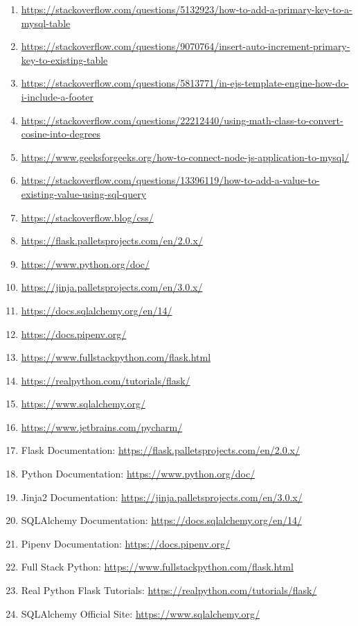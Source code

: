 \begin{enumerate}
  \item \raggedright
    \url{https://stackoverflow.com/questions/5132923/how-to-add-a-primary-key-to-a-mysql-table}
  \item \raggedright
    \url{https://stackoverflow.com/questions/9070764/insert-auto-increment-primary-key-to-existing-table}
  \item \raggedright
    \url{https://stackoverflow.com/questions/5813771/in-ejs-template-engine-how-do-i-include-a-footer}
  \item \raggedright
    \url{https://stackoverflow.com/questions/22212440/using-math-class-to-convert-cosine-into-degrees}
  \item \raggedright
    \url{https://www.geeksforgeeks.org/how-to-connect-node-js-application-to-mysql/}
  \item \raggedright
    \url{https://stackoverflow.com/questions/13396119/how-to-add-a-value-to-existing-value-using-sql-query}
  \item \raggedright \url{https://stackoverflow.blog/css/}

  \item \raggedright \url{https://flask.palletsprojects.com/en/2.0.x/}
  \item \raggedright \url{https://www.python.org/doc/}
  \item \raggedright \url{https://jinja.palletsprojects.com/en/3.0.x/}
  \item \raggedright \url{https://docs.sqlalchemy.org/en/14/}
  \item \raggedright \url{https://docs.pipenv.org/}
  \item \raggedright \url{https://www.fullstackpython.com/flask.html}
  \item \raggedright \url{https://realpython.com/tutorials/flask/}
  \item \raggedright \url{https://www.sqlalchemy.org/}
  \item \raggedright \url{https://www.jetbrains.com/pycharm/}

  \item \raggedright Flask Documentation:
    \url{https://flask.palletsprojects.com/en/2.0.x/}
  \item \raggedright Python Documentation: \url{https://www.python.org/doc/}
  \item \raggedright Jinja2 Documentation:
    \url{https://jinja.palletsprojects.com/en/3.0.x/}
  \item \raggedright SQLAlchemy Documentation:
    \url{https://docs.sqlalchemy.org/en/14/}
  \item \raggedright Pipenv Documentation: \url{https://docs.pipenv.org/}
  \item \raggedright Full Stack Python:
    \url{https://www.fullstackpython.com/flask.html}
  \item \raggedright Real Python Flask Tutorials:
    \url{https://realpython.com/tutorials/flask/}
  \item \raggedright SQLAlchemy Official Site: \url{https://www.sqlalchemy.org/}
\end{enumerate}

